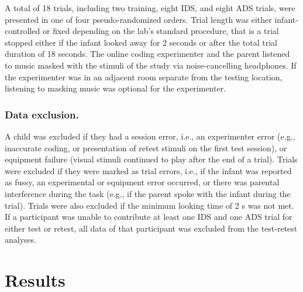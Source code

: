 \documentclass[
  man,floatsintext]{apa6}
\begin{document}
A total of 18 trials, including two training, eight IDS, and eight ADS trials, were presented in one of four pseudo-randomized orders.
Trial length was either infant-controlled or fixed depending on the lab's standard procedure, that is a trial stopped either if the infant looked away for 2 seconds or after the total trial duration of 18 seconds.
The online coding experimenter and the parent listened to music masked with the stimuli of the study via noise-cancelling headphones.
If the experimenter was in an adjacent room separate from the testing location, listening to masking music was optional for the experimenter.

\hypertarget{data-exclusion.}{%
\subsubsection{Data exclusion.}\label{data-exclusion.}}

A child was excluded if they had a session error, i.e., an experimenter error (e.g., inaccurate coding, or presentation of retest stimuli on the first test session), or equipment failure (visual stimuli continued to play after the end of a trial).
Trials were excluded if they were marked as trial errors, i.e., if the infant was reported as fussy, an experimental or equipment error occurred, or there was parental interference during the task (e.g., if the parent spoke with the infant during the trial).
Trials were also excluded if the minimum looking time of 2 s was not met.
If a participant was unable to contribute at least one IDS and one ADS trial for either test or retest, all data of that participant was excluded from the test-retest analyses.

\hypertarget{results}{%
\section{Results}\label{results}}
\end{document}

